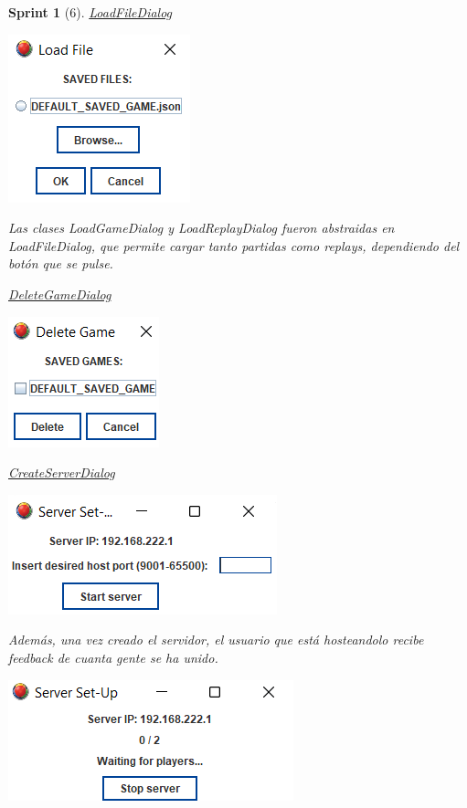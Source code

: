 \documentclass{article}
\theoremstyle{break}
\newtheorem*{sprint}{Sprint}
\begin{document}
\begin{sprint}[6]
\underline{LoadFileDialog}
\begin{center}
\includegraphics[scale=1]{load-game-sprint-6.png}
\end{center}

Las clases \textit{LoadGameDialog} y \textit{LoadReplayDialog} fueron abstraidas en \textit{LoadFileDialog}, que permite cargar tanto partidas como \textit{replays}, dependiendo del botón que se pulse.

\underline{DeleteGameDialog}
\begin{center}
\includegraphics[scale=1]{delete-dialog-sprint6.png}
\end{center}

\underline{CreateServerDialog}

\begin{center}
\includegraphics[scale=1]{server-setup-sprint-6.png}
\end{center}

Además, una vez creado el servidor, el usuario que está hosteandolo recibe feedback de cuanta gente se ha unido.

\begin{center}
\includegraphics[scale=1]{server-feedback.png}
\end{center}


\end{sprint}
\end{document}
